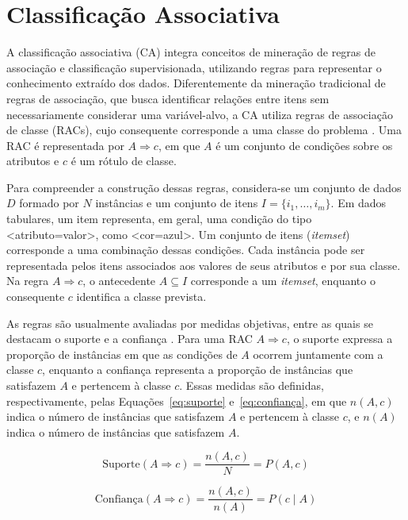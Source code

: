 \section{Classificação Associativa}\label{sec:ca}

A classificação associativa (CA) integra conceitos de mineração de regras de associação e classificação supervisionada, utilizando regras para representar o conhecimento extraído dos dados. Diferentemente da mineração tradicional de regras de associação, que busca identificar relações entre itens sem necessariamente considerar uma variável-alvo, a CA utiliza regras de associação de classe (RACs), cujo consequente corresponde a uma classe do problema \cite{liu1998}. Uma RAC é representada por $A \Rightarrow c$, em que $A$ é um conjunto de condições sobre os atributos e $c$ é um rótulo de classe.

Para compreender a construção dessas regras, considera-se um conjunto de dados $D$ formado por $N$ instâncias e um conjunto de itens $I=\{i_1,\ldots,i_m\}$. Em dados tabulares, um item representa, em geral, uma condição do tipo <atributo=valor>, como <cor=azul>. Um conjunto de itens (\textit{itemset}) corresponde a uma combinação dessas condições. Cada instância pode ser representada pelos itens associados aos valores de seus atributos e por sua classe. Na regra $A \Rightarrow c$, o antecedente $A \subseteq I$ corresponde a um \textit{itemset}, enquanto o consequente $c$ identifica a classe prevista.

As regras são usualmente avaliadas por medidas objetivas, entre as quais se destacam o suporte e a confiança \cite{apriori}. Para uma RAC $A \Rightarrow c$, o suporte expressa a proporção de instâncias em que as condições de $A$ ocorrem juntamente com a classe $c$, enquanto a confiança representa a proporção de instâncias que satisfazem $A$ e pertencem à classe $c$. Essas medidas são definidas, respectivamente, pelas Equações~\ref{eq:suporte} e~\ref{eq:confiança}, em que $n(A,c)$ indica o número de instâncias que satisfazem $A$ e pertencem à classe $c$, e $n(A)$ indica o número de instâncias que satisfazem $A$.

\begin{equation}
\text{Suporte}(A \Rightarrow c) = \frac{n(A,c)}{N} = P(A,c)
\label{eq:suporte}
\end{equation}

\begin{equation}
\text{Confiança}(A \Rightarrow c) = \frac{n(A,c)}{n(A)} = P(c\mid A)
\label{eq:confiança}
\end{equation}

